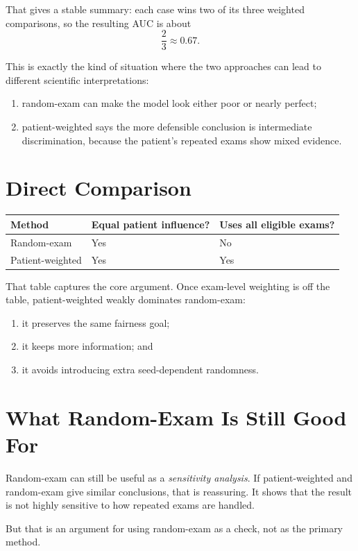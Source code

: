 \documentclass[11pt]{article}
\begin{document}
That gives a stable summary: each case wins two of its three weighted comparisons, so the resulting AUC is about
\[
\frac{2}{3} \approx 0.67.
\]

This is exactly the kind of situation where the two approaches can lead to different scientific interpretations:
\begin{enumerate}[leftmargin=2em]
\item random-exam can make the model look either poor or nearly perfect;
\item patient-weighted says the more defensible conclusion is intermediate discrimination, because the patient's repeated exams show mixed evidence.
\end{enumerate}

\section*{Direct Comparison}
\begin{center}
\begin{tabular}{lll}
\toprule
Method & Equal patient influence? & Uses all eligible exams? \\
\midrule
Random-exam & Yes & No \\
Patient-weighted & Yes & Yes \\
\bottomrule
\end{tabular}
\end{center}

That table captures the core argument. Once exam-level weighting is off the table, patient-weighted weakly dominates random-exam:
\begin{enumerate}[leftmargin=2em]
\item it preserves the same fairness goal;
\item it keeps more information; and
\item it avoids introducing extra seed-dependent randomness.
\end{enumerate}

\section*{What Random-Exam Is Still Good For}
Random-exam can still be useful as a \emph{sensitivity analysis}. If patient-weighted and random-exam give similar conclusions, that is reassuring. It shows that the result is not highly sensitive to how repeated exams are handled.

But that is an argument for using random-exam as a check, not as the primary method.
\end{document}
